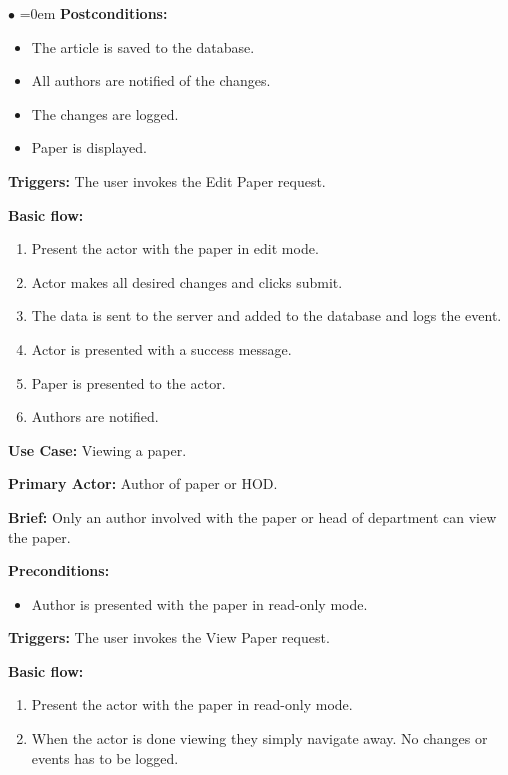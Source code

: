 \documentclass[english]{article}
\begin{document}
\begin{list}{$\bullet$}{\leftmargin=1.5cm \itemindent=0em}
				\textbf{Postconditions:}
					\begin{itemize}
						\item The article is saved to the database.
						\item All authors are notified of the changes.
						\item The changes are logged.
						\item Paper is displayed.
					\end{itemize}
					
				\textbf{Triggers:} The user invokes the Edit Paper request.
				
				\textbf{Basic flow:}
					\begin{enumerate}
						\item Present the actor with the paper in edit mode.
						\item Actor makes all desired changes and clicks submit.
						\item The data is sent to the server and added to the database and logs the event.
						\item Actor is presented with a success message.
						\item Paper is presented to the actor.
						\item Authors are notified.
					\end{enumerate}
					
					\item\textbf{Use Case:} Viewing a paper.
					
					\textbf{Primary Actor:} Author of paper or HOD.
					
					\textbf{Brief:} Only an author involved with the paper or head of department can view the paper.
					
					\textbf{Preconditions:}
					\begin{itemize}
						\item Author is presented with the paper in read-only mode.
					\end{itemize}
					
					\textbf{Triggers:} The user invokes the View Paper request.
					
					\textbf{Basic flow:}
					\begin{enumerate}
						\item Present the actor with the paper in read-only mode.
						\item When the actor is done viewing they simply navigate away. No changes or events has to be logged.
					\end{enumerate}
			\end{list}
\end{document}
